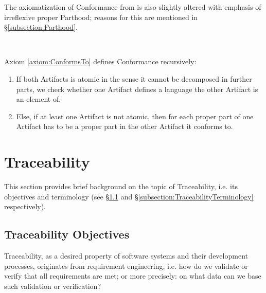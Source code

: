 The axiomatization of \gls{Conformance} from \cite{DBLP:conf/modelsward/HeinzLV17} is also slightly altered with emphasis of irreflexive proper \gls{Parthood}; reasons for this are mentioned in §\ref{subsection:Parthood}.
\begin{axiom}[\conformsTo]
\label{axiom:ConformsTo}
~\newline
{}
\end{axiom}
Axiom \ref{axiom:ConformsTo} defines \gls{Conformance} recursively:
\begin{enumerate}[align=left,label=\textbf{Case \Roman*},ref={\Roman*}]
\item
If both \glspl{Artifact} is atomic in the sense it cannot be decomposed in further parts, we check whether one \gls{Artifact} defines a language the other \gls{Artifact} is an element of.

\item
Else, if at least one \gls{Artifact} is not atomic, then for each proper part of one \gls{Artifact} has to be a proper part in the other \gls{Artifact} it conforms to.
\end{enumerate}


\section{Traceability}
\label{section:Traceability}
This section provides brief background on the topic of \gls{Traceability}, i.e. its objectives and terminology (see §\ref{subsection:TraceabilityObjectives} and §\ref{subsection:TraceabilityTerminology} respectively).

\subsection{Traceability Objectives}
\label{subsection:TraceabilityObjectives}
\Gls{Traceability}, as a desired property of software systems and their development processes, originates from requirement engineering, i.e.
how do we validate or verify that all requirements are met;
or more precisely: on what data can we base such validation or verification?
\cite{DBLP:journals/sosym/WinklerP10}

